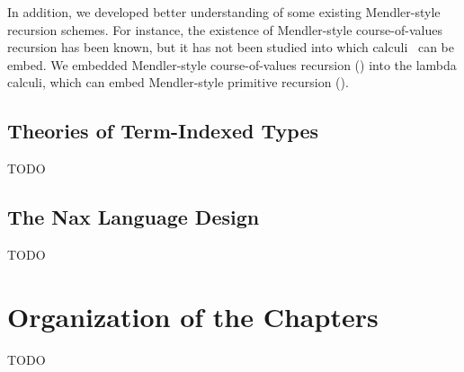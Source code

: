 In addition, we developed better understanding of some existing Mendler-style
recursion schemes. For instance, the existence of Mendler-style course-of-values
recursion has been known, but it has not been studied into which calculi
\McvPr\ can be embed. We embedded Mendler-style course-of-values recursion
(\McvPr) into the lambda calculi, which can embed Mendler-style primitive
recursion (\MPr).


\subsection{Theories of Term-Indexed Types}
TODO

\subsection{The Nax Language Design}
TODO

\section{Organization of the Chapters}\label{sec:intro:org}
TODO

